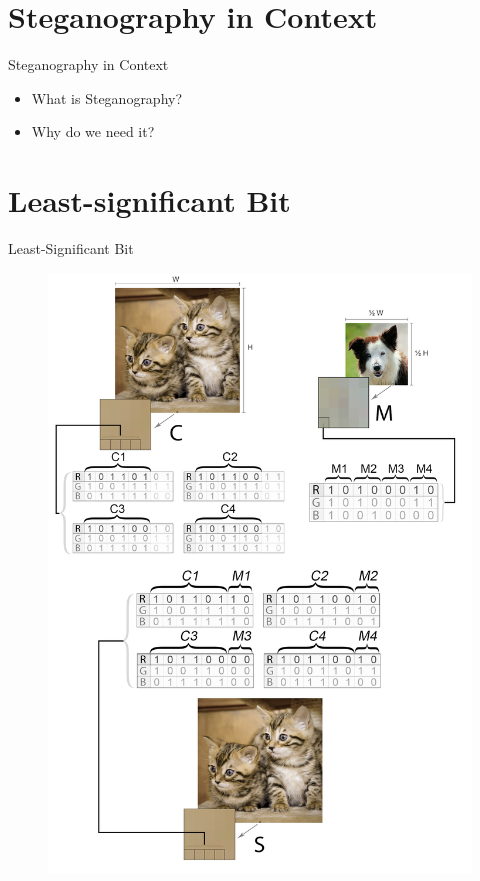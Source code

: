 \section{Steganography in Context}
\begin{frame}{Steganography in Context}{}
	\begin{itemize}
		\item What is Steganography?
		\item Why do we need it?
	\end{itemize}
\end{frame}

\section{Least-significant Bit}
\begin{frame}{Least-Significant Bit}{}
	\begin{figure}[!H]
			\centering
			\includegraphics[width=.55\textwidth]{./Jacob/hundikatgrafik.png}
	\end{figure}
\end{frame}
